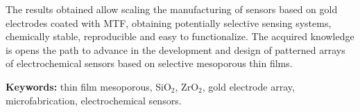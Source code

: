 The results obtained allow scaling the manufacturing of sensors based on gold electrodes coated with MTF, obtaining potentially selective sensing systems, chemically stable, reproducible and easy to functionalize. The acquired knowledge is opens the path to advance in the development and design of patterned arrays of electrochemical sensors based on selective mesoporous thin films.

\vspace*{\fill}

\vfill

\noindent\textbf{Keywords:} thin film mesoporous, SiO$_2$, ZrO$_2$, gold electrode array, microfabrication, electrochemical sensors.

\cleardoublepage

